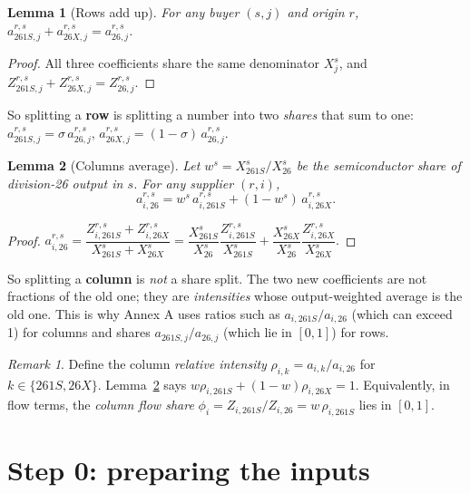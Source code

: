 \documentclass[11pt,a4paper]{article}
\newtheorem{lemma}{Lemma}
\theoremstyle{remark}
\newtheorem{remark}{Remark}
\theoremstyle{definition}
\newcommand{\sem}{{261S}}   %
\newcommand{\oth}{{26X}}    %
\newcommand{\agg}{{26}}     %
\begin{document}
\begin{lemma}[Rows add up]\label{lem:rows}
For any buyer $(s,j)$ and origin $r$,
$a^{r,s}_{\sem,j} + a^{r,s}_{\oth,j} = a^{r,s}_{\agg,j}$.
\end{lemma}
\begin{proof}
All three coefficients share the same denominator $X^s_j$, and $Z^{r,s}_{\sem,j}+Z^{r,s}_{\oth,j}=Z^{r,s}_{\agg,j}$.
\end{proof}

So splitting a \textbf{row} is splitting a number into two \emph{shares} that sum to one:
$a^{r,s}_{\sem,j} = \sigma\, a^{r,s}_{\agg,j}$, $a^{r,s}_{\oth,j} = (1-\sigma)\, a^{r,s}_{\agg,j}$.

\begin{lemma}[Columns average]\label{lem:cols}
Let $w^s = X^s_\sem / X^s_\agg$ be the semiconductor share of division-26 output in $s$. For any supplier $(r,i)$,
\[
  a^{r,s}_{i,\agg} = w^s\, a^{r,s}_{i,\sem} + (1-w^s)\, a^{r,s}_{i,\oth}.
\]
\end{lemma}
\begin{proof}
$a^{r,s}_{i,\agg} = \dfrac{Z^{r,s}_{i,\sem}+Z^{r,s}_{i,\oth}}{X^s_\sem + X^s_\oth}
 = \dfrac{X^s_\sem}{X^s_\agg}\dfrac{Z^{r,s}_{i,\sem}}{X^s_\sem} + \dfrac{X^s_\oth}{X^s_\agg}\dfrac{Z^{r,s}_{i,\oth}}{X^s_\oth}.$
\end{proof}

So splitting a \textbf{column} is \emph{not} a share split. The two new coefficients are not fractions of the old
one; they are \emph{intensities} whose output-weighted average is the old one. This is why Annex A uses ratios
such as $a_{i,\sem}/a_{i,\agg}$ (which can exceed 1) for columns and shares $a_{\sem,j}/a_{\agg,j}$ (which lie in
$[0,1]$) for rows.

\begin{remark}\label{rem:rho}
Define the column \emph{relative intensity} $\rho_{i,k} = a_{i,k}/a_{i,\agg}$ for $k\in\{\sem,\oth\}$.
Lemma~\ref{lem:cols} says $w\rho_{i,\sem} + (1-w)\rho_{i,\oth} = 1$. Equivalently, in flow terms,
the \emph{column flow share} $\phi_i = Z_{i,\sem}/Z_{i,\agg} = w\,\rho_{i,\sem}$ lies in $[0,1]$.
\end{remark}

\section{Step 0: preparing the inputs}
\end{document}
